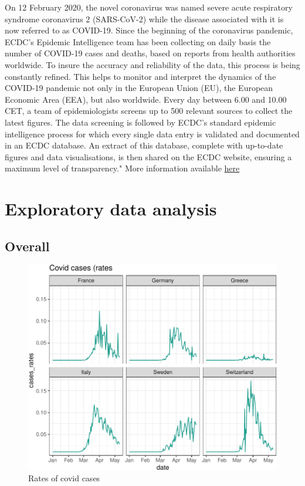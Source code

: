 \documentclass[11pt,a4paper,]{article}
\begin{document}
On 12 February 2020, the novel coronavirus was named severe acute respiratory syndrome coronavirus 2 (SARS-CoV-2) while the disease associated with it is now referred to as COVID-19. Since the beginning of the coronavirus pandemic, ECDC's Epidemic Intelligence team has been collecting on daily basis the number of COVID-19 cases and deaths, based on reports from health authorities worldwide. To insure the accuracy and reliability of the data, this process is being constantly refined. This helps to monitor and interpret the dynamics of the COVID-19 pandemic not only in the European Union (EU), the European Economic Area (EEA), but also worldwide. Every day between 6.00 and 10.00 CET, a team of epidemiologists screens up to 500 relevant sources to collect the latest figures. The data screening is followed by ECDC's standard epidemic intelligence process for which every single data entry is validated and documented in an ECDC database. An extract of this database, complete with up-to-date figures and data visualisations, is then shared on the ECDC website, ensuring a maximum level of transparency." More information available \href{https://data.europa.eu/euodp/en/data/dataset/covid-19-coronavirus-data}{here}

\hypertarget{exploratory-data-analysis}{%
\section{Exploratory data analysis}\label{exploratory-data-analysis}}

\hypertarget{overall}{%
\subsection{Overall}\label{overall}}

\begin{figure}

{\centering \includegraphics{Week8_demo_files/figure-latex/covid-europe-1} 

}

\caption{Rates of covid cases}\label{fig:covid-europe}
\end{figure}
\end{document}
